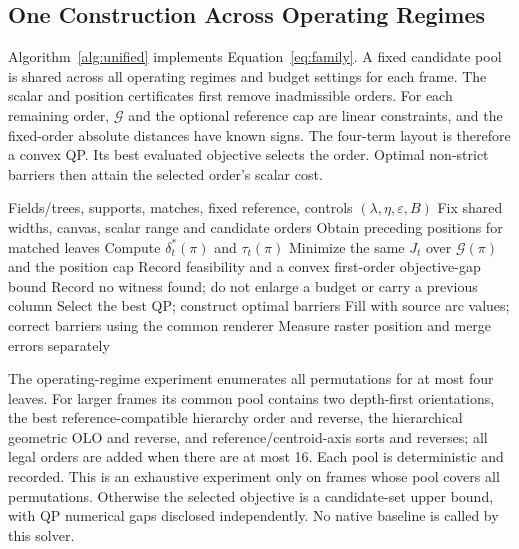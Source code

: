 \subsection{One Construction Across Operating Regimes}\label{sec:unified_solver}
Algorithm~\ref{alg:unified} implements Equation~\eqref{eq:family}. A fixed candidate pool is shared across all operating regimes and budget settings for each frame. The scalar and position certificates first remove inadmissible orders. For each remaining order, $\mathcal G$ and the optional reference cap are linear constraints, and the fixed-order absolute distances have known signs. The four-term layout is therefore a convex QP. Its best evaluated objective selects the order. Optimal non-strict barriers then attain the selected order's scalar cost.

\begin{algorithm}[t]
\caption{Unified position--topology construction}\label{alg:unified}
\begin{algorithmic}[1]
\Require Fields/trees, supports, matches, fixed reference, controls $(\lambda,\eta,\varepsilon,B)$
\State Fix shared widths, canvas, scalar range and candidate orders
 \State Obtain preceding positions for matched leaves
  \State Compute $\delta_t^*(\pi)$ and $\tau_t(\pi)$
   \State Minimize the same $J_t$ over $\mathcal G(\pi)$ and the position cap
   \State Record feasibility and a convex first-order objective-gap bound
  \EndIf
 \EndFor
  \State Record no witness found; do not enlarge a budget or carry a previous column
 \Else
  \State Select the best QP; construct optimal barriers
  \State Fill with source arc values; correct barriers using the common renderer
  \State Measure raster position and merge errors separately
 \EndIf
\EndFor
\end{algorithmic}
\end{algorithm}

The operating-regime experiment enumerates all permutations for at most four leaves. For larger frames its common pool contains two depth-first orientations, the best reference-compatible hierarchy order and reverse, the hierarchical geometric OLO and reverse, and reference/centroid-axis sorts and reverses; all legal orders are added when there are at most 16. Each pool is deterministic and recorded. This is an exhaustive experiment only on frames whose pool covers all permutations. Otherwise the selected objective is a candidate-set upper bound, with QP numerical gaps disclosed independently. No native baseline is called by this solver.


